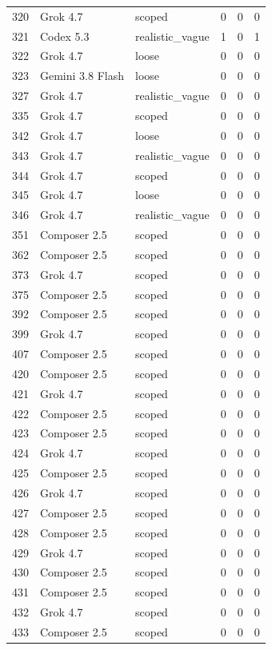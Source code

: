 \begin{tabular}{llllll}
320 & Grok 4.7 & scoped & 0 & 0 & 0 \\
321 & Codex 5.3 & realistic\_vague & 1 & 0 & 1 \\
322 & Grok 4.7 & loose & 0 & 0 & 0 \\
323 & Gemini 3.8 Flash & loose & 0 & 0 & 0 \\
327 & Grok 4.7 & realistic\_vague & 0 & 0 & 0 \\
335 & Grok 4.7 & scoped & 0 & 0 & 0 \\
342 & Grok 4.7 & loose & 0 & 0 & 0 \\
343 & Grok 4.7 & realistic\_vague & 0 & 0 & 0 \\
344 & Grok 4.7 & scoped & 0 & 0 & 0 \\
345 & Grok 4.7 & loose & 0 & 0 & 0 \\
346 & Grok 4.7 & realistic\_vague & 0 & 0 & 0 \\
351 & Composer 2.5 & scoped & 0 & 0 & 0 \\
362 & Composer 2.5 & scoped & 0 & 0 & 0 \\
373 & Grok 4.7 & scoped & 0 & 0 & 0 \\
375 & Composer 2.5 & scoped & 0 & 0 & 0 \\
392 & Composer 2.5 & scoped & 0 & 0 & 0 \\
399 & Grok 4.7 & scoped & 0 & 0 & 0 \\
407 & Composer 2.5 & scoped & 0 & 0 & 0 \\
420 & Composer 2.5 & scoped & 0 & 0 & 0 \\
421 & Grok 4.7 & scoped & 0 & 0 & 0 \\
422 & Composer 2.5 & scoped & 0 & 0 & 0 \\
423 & Composer 2.5 & scoped & 0 & 0 & 0 \\
424 & Grok 4.7 & scoped & 0 & 0 & 0 \\
425 & Composer 2.5 & scoped & 0 & 0 & 0 \\
426 & Grok 4.7 & scoped & 0 & 0 & 0 \\
427 & Composer 2.5 & scoped & 0 & 0 & 0 \\
428 & Composer 2.5 & scoped & 0 & 0 & 0 \\
429 & Grok 4.7 & scoped & 0 & 0 & 0 \\
430 & Composer 2.5 & scoped & 0 & 0 & 0 \\
431 & Composer 2.5 & scoped & 0 & 0 & 0 \\
432 & Grok 4.7 & scoped & 0 & 0 & 0 \\
433 & Composer 2.5 & scoped & 0 & 0 & 0 \\

\end{tabular}
